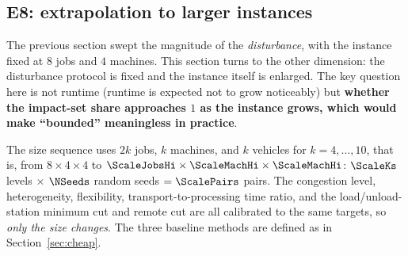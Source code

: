 \subsection{E8: extrapolation to larger instances}
\label{sec:instscale}

The previous section swept the magnitude of the \emph{disturbance}, with the instance fixed at \(8\) jobs and \(4\) machines. This section turns to the other dimension: the disturbance protocol is fixed and
the instance itself is enlarged. The key question here is not runtime (runtime is expected not to grow noticeably) but \textbf{whether the impact-set share
approaches \(1\) as the instance grows, which would make ``bounded'' meaningless in practice}.

The size sequence uses \(2k\) jobs, \(k\) machines, and \(k\) vehicles for \(k=4,\dots,10\), that is, from \(8\times4\times4\) to
\(\ScaleJobsHi\times\ScaleMachHi\times\ScaleMachHi\): \(\ScaleKs\) levels \(\times\)
\(\NSeeds\) random seeds \(=\ScalePairs\) pairs. The congestion level, heterogeneity, flexibility, transport-to-processing time ratio, and the load/unload-station
minimum cut and remote cut are all calibrated to the same targets, so \emph{only the size changes}. The three baseline methods are defined as in Section~\ref{sec:cheap}.

